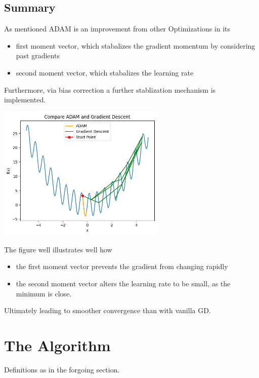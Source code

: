 \documentclass[oneside]{article}
\begin{document}
\subsection{Summary}
As mentioned ADAM is an improvement from other Optimizations in its
\begin{itemize}
    \item first moment vector, which stabalizes the gradient momentum by considering past gradients
    \item second moment vector, which stabalizes the learning rate
\end{itemize}
Furthermore, via bias correction a further stablization mechanism is implemented.\\
\begin{center}
    \includegraphics[width=0.6\textwidth]{report/figures/adam_vs_gradientdescent.png}\\
\end{center}
The figure well illustrates well how
\begin{itemize}
    \item the first moment vector prevents the gradient from changing rapidly
    \item the second moment vector alters the learning rate to be small, as the minimum is close.
\end{itemize}
Ultimately leading to smoother convergence than with vanilla GD.

\section{The Algorithm}
Definitions as in the forgoing section.
\end{document}
